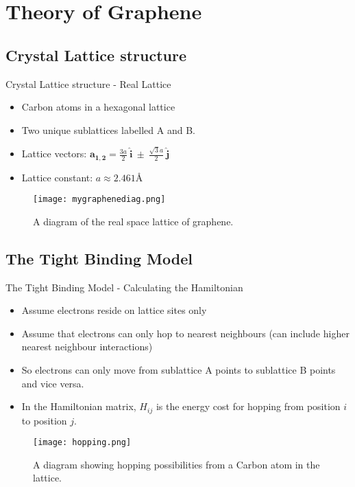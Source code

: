 \documentclass{beamer}
\begin{document}
\section{Theory of Graphene}
\subsection{Crystal Lattice structure}
\begin{frame}[t]{Crystal Lattice structure - Real Lattice}
\begin{itemize}
\item Carbon atoms in a hexagonal lattice
\item Two unique sublattices labelled A and B.
\item Lattice vectors: $\mathbf{a_{1,2}} = \frac{3a}{2} ~\mathbf{\hat i}~ \pm~ \frac{\sqrt{3}a}{2} ~\mathbf{\hat j}$
\item Lattice constant: $a \approx 2.461\text{\AA}$
\end{itemize}

\begin{figure}[c]
\texttt{[image: mygraphenediag.png]}
\caption{A diagram of the real space lattice of graphene.}
\end{figure}
\end{frame}

\subsection{The Tight Binding Model}
\begin{frame}[t]{The Tight Binding Model - Calculating the Hamiltonian}
\begin{itemize}
\item Assume electrons reside on lattice sites only
\item Assume that electrons can only hop to nearest neighbours (can include higher nearest neighbour interactions)
\item So electrons can only move from sublattice A points to sublattice B points and vice versa.
\item In the Hamiltonian matrix, $H_{ij}$ is the energy cost for hopping from position $i$ to position $j$.
\end{itemize}
\begin{figure}[c]
\texttt{[image: hopping.png]}
\caption{A diagram showing hopping possibilities from a Carbon atom in the lattice.}
\end{figure}
\end{frame}
\end{document}
